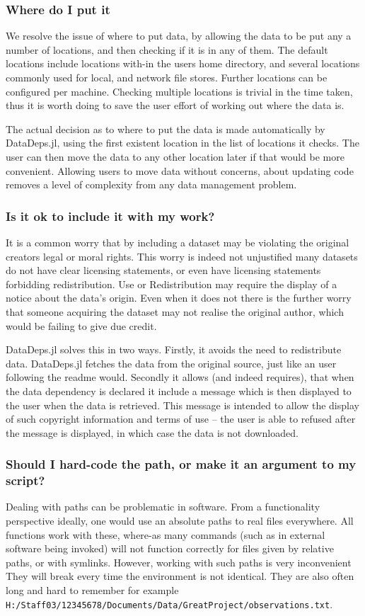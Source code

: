 \documentclass{jors}
\begin{document}
\subsubsection{Where do I put it}
We resolve the issue of where to put data, by allowing the data to be put any a number of locations, and then checking if it is in any of them.
The default locations include locations with-in the users home directory, and several locations commonly used for local, and network file stores.
Further locations can be configured per machine.
Checking multiple locations is trivial in the time taken, thus it is worth doing to save the user effort of working out where the data is.

The actual decision as to where to put the data is made automatically by DataDeps.jl, using the first existent location in the list of locations it checks.
The user can then move the data to any other location later if that would be more convenient.
Allowing users to move data without concerns, about updating code removes a level of complexity from any data management problem.


\subsubsection{Is it ok to include it with my work?}
It is a common worry that by including a dataset may be violating the original creators legal or moral rights.
This worry is indeed not unjustified many datasets do not have clear licensing statements,
or even have licensing statements forbidding redistribution.
Use or Redistribution may require the display of a notice about the data's origin.
Even when it does not there is the further worry that someone acquiring the dataset may not realise the original author, which would be failing to give due credit.


DataDeps.jl solves this in two ways.
Firstly, it avoids the need to redistribute data.
DataDeps.jl fetches the data from the original source, just like an user following the readme would.
Secondly it allows (and indeed requires), that when the data dependency is declared it include a message which is then displayed to the user when the data is retrieved.
This message is intended to allow the display of such copyright information and terms of use -- the user is able to refused after the message is displayed, in which case the data is not downloaded.

\subsubsection{Should I hard-code the path, or make it an argument to my script?}
Dealing with paths can be problematic in software.
From a functionality perspective ideally, one would use an absolute paths to real files everywhere.
All functions work with these, where-as many commands (such as in external software being invoked) will not function correctly for files given by relative paths, or with symlinks.
However, working with such paths is very inconvenient
They will break every time the environment is not identical.
They are also often long and hard to remember for example \texttt{H:/Staff03/12345678/Documents/Data/GreatProject/observations.txt}.
\end{document}

